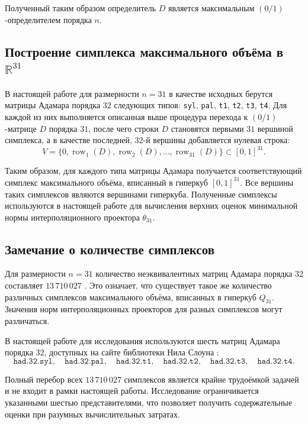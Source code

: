 \documentclass[main]{subfiles}
\begin{document}
Полученный таким образом определитель $D$ является максимальным $(0/1)$-определителем порядка $n$.

\subsection{Построение симплекса максимального объёма в $\mathbb{R}^{31}$}

В настоящей работе для размерности $n = 31$ в качестве исходных берутся матрицы Адамара порядка $32$ следующих типов: \texttt{syl}, \texttt{pal}, \texttt{t1}, \texttt{t2}, \texttt{t3}, \texttt{t4}. Для каждой из них выполняется описанная выше процедура перехода к $(0/1)$-матрице $D$ порядка $31$, после чего строки $D$ становятся первыми $31$ вершиной симплекса, а в качестве последней, $32$-й вершины добавляется нулевая строка:
\[
V = \{0, \operatorname{row}_1(D), \operatorname{row}_2(D), \dots, \operatorname{row}_{31}(D)\} \subset [0,1]^{31}.
\]

Таким образом, для каждого типа матрицы Адамара получается соответствующий симплекс максимального объёма, вписанный в гиперкуб $[0,1]^{31}$. Все вершины таких симплексов являются вершинами гиперкуба. Полученные симплексы используются в настоящей работе для вычисления верхних оценок минимальной нормы интерполяционного проектора $\theta_{31}$.

\subsection{Замечание о количестве симплексов}

Для размерности $n = 31$ количество неэквивалентных матриц Адамара порядка $32$ составляет $13\,710\,027$ \cite{kharaghani2013hadamard}. Это означает, что существует такое же количество различных симплексов максимального объёма, вписанных в гиперкуб $Q_{31}$. Значения норм интерполяционных проекторов для разных симплексов могут различаться.
\par
В настоящей работе для исследования используются шесть матриц Адамара порядка $32$, доступных на сайте библиотеки Нила Слоуна \cite{sloane_hadamard}:
\[
\texttt{had.32.syl},\quad \texttt{had.32.pal},\quad \texttt{had.32.t1},\quad \texttt{had.32.t2},\quad \texttt{had.32.t3},\quad \texttt{had.32.t4}.
\]

Полный перебор всех $13\,710\,027$ симплексов является крайне трудоёмкой задачей и не входит в рамки настоящей работы. Исследование ограничивается указанными шестью представителями, что позволяет получить содержательные оценки при разумных вычислительных затратах.
\end{document}
